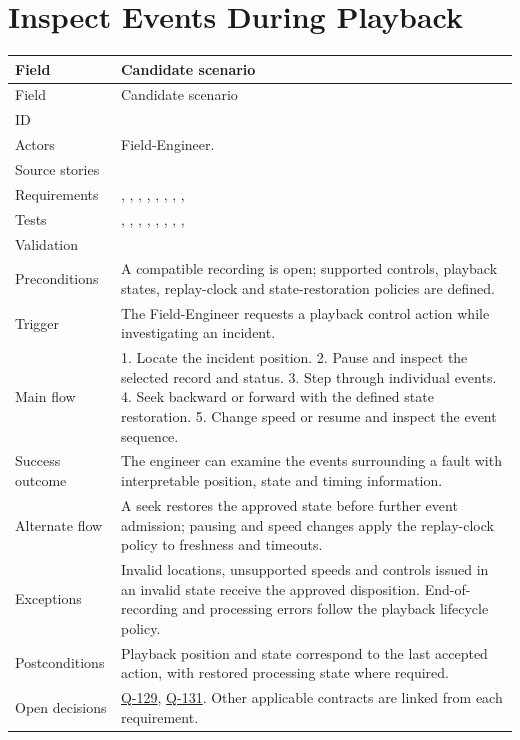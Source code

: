 \section{Inspect Events During Playback}
\par\medskip
\small
\begin{tabularx}{\linewidth}{L{2.8cm}Y}
\caption{Inspect Events During Playback\label{Table:UC-06}}\\
\toprule
Field & Candidate scenario\\\midrule
\endfirsthead
\toprule
Field & Candidate scenario\\\midrule
\endhead
\bottomrule
\endlastfoot
ID & \\
Actors & Field-Engineer.\\
Source stories & \\
Requirements & , , , , , , , , \\
Tests & , , , , , , , , \\
Validation & \\
Preconditions & A compatible recording is open; supported controls, playback states, replay-clock and state-restoration policies are defined.\\
Trigger & The Field-Engineer requests a playback control action while investigating an incident.\\
Main flow & 1. Locate the incident position. 2. Pause and inspect the selected record and status. 3. Step through individual events. 4. Seek backward or forward with the defined state restoration. 5. Change speed or resume and inspect the event sequence.\\
Success outcome & The engineer can examine the events surrounding a fault with interpretable position, state and timing information.\\
Alternate flow & A seek restores the approved state before further event admission; pausing and speed changes apply the replay-clock policy to freshness and timeouts.\\
Exceptions & Invalid locations, unsupported speeds and controls issued in an invalid state receive the approved disposition. End-of-recording and processing errors follow the playback lifecycle policy.\\
Postconditions & Playback position and state correspond to the last accepted action, with restored processing state where required.\\
Open decisions & \hyperref[Question:Q-129]{Q-129}, \hyperref[Question:Q-131]{Q-131}. Other applicable contracts are linked from each requirement.\\
\end{tabularx}
